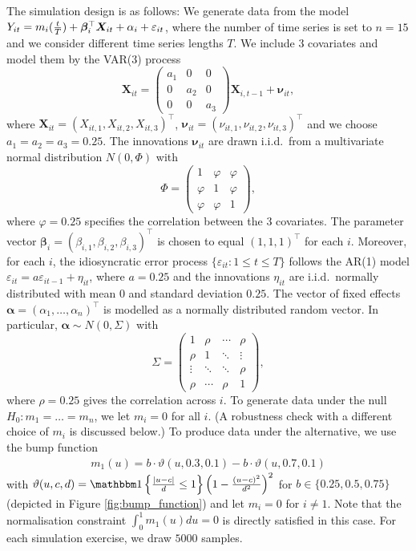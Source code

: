 \documentclass[12pt]{article}
\begin{document}
The simulation design is as follows: We generate data from the model $Y_{it} = m_i(\frac{t}{T}) + \bm{\beta}_i^\top \boldsymbol{X}_{it} +  \alpha_i  + \varepsilon_{it}$, where the number of time series is set to $n = 15$ and we consider different time series lengths $T$. We include $3$ covariates and model them by the VAR(3) process
\[ \boldsymbol{X}_{it} = \begin{pmatrix} a_1 & 0 & 0 \\ 0 & a_2 & 0 \\ 0 & 0 & a_3 \end{pmatrix} \boldsymbol{X}_{i,t-1} + \boldsymbol{\nu}_{it}, \] 
where $\boldsymbol{X}_{it} = ( X_{it,1}, X_{it,2}, X_{it,3} )^\top$, $\boldsymbol{\nu}_{it} = ( \nu_{it,1}, \nu_{it,2}, \nu_{it,3} )^\top$ and we choose $a_1 = a_2 = a_3 = 0.25$. The innovations $\boldsymbol{\nu}_{it}$ are drawn i.i.d.\ from a multivariate normal distribution $N(0,\Phi)$ with
\[ \Phi = \begin{pmatrix} 1 & \varphi & \varphi \\ \varphi & 1 & \varphi \\ \varphi & \varphi & 1 \end{pmatrix}, \]
where $\varphi = 0.25$ specifies the correlation between the 3 covariates.
The parameter vector $\boldsymbol{\beta}_i = (\beta_{i,1},\beta_{i,2},\beta_{i,3})^\top$ is chosen to equal $(1,1,1)^\top$ for each $i$. Moreover, for each $i$, the idiosyncratic error process $\{\varepsilon_{it}: 1 \le t \le T\}$ follows the AR(1) model $\varepsilon_{it} = a \varepsilon_{i t-1} + \eta_{it}$, where $a = 0.25$ and the innovations $\eta_{it}$ are i.i.d.\ normally distributed with mean $0$ and standard deviation $0.25$. 
The vector of fixed effects $\boldsymbol{\alpha} = (\alpha_1,\ldots,\alpha_n)^\top$ is modelled as a normally distributed random vector. In particular, $\boldsymbol{\alpha} \sim N(0,\Sigma)$ with
\[ \Sigma =
\begin{pmatrix}
1      & \rho   & \cdots & \rho   \\
\rho   & 1      & \ddots & \vdots \\
\vdots & \ddots & \ddots & \rho   \\
\rho   & \cdots & \rho   & 1
\end{pmatrix},
\]
where $\rho = 0.25$ gives the correlation across $i$.
To generate data under the null $H_0: m_1 = \ldots = m_n$, we let $m_i = 0$ for all $i$. (A robustness check with a different choice of $m_i$ is discussed below.) To produce data under the alternative, we use the bump function
\begin{align}
m_1(u) =  b \cdot  \vartheta(u, 0.3, 0.1) - b  \cdot  \vartheta(u,0.7, 0.1)  \label{eq:bump-fct}
\end{align}
with $\vartheta(u,c,d) =  \ind \left\{\frac{|u - c|}{d}\leq 1 \right\} \left(1 - \frac{(u - c)^2}{d^2}\right)^2$ for $b \in \{ 0.25, 0.5, 0.75 \}$ (depicted in Figure \ref{fig:bump_function}) and let $m_i = 0$ for $i \neq 1$. Note that the normalisation constraint $\int_0^1 m_1(u) du = 0$ is directly satisfied in this case. For each simulation exercise, we draw $5000$ samples.
\end{document}
